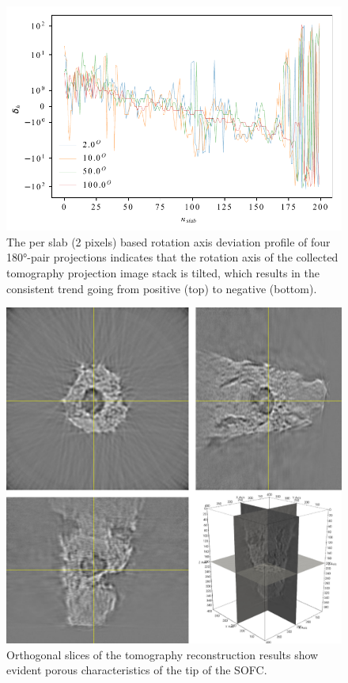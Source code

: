 \documentclass[12pt]{scrartcl}
\newcommand{\myscale}{1}
\begin{document}
\renewcommand{\myscale}{1.0}
\begin{figure}[htp]
\centering
\includegraphics[scale=\myscale]{rotationAxisTiltDemo_retouched}
\caption{
The per slab (2 pixels) based rotation axis deviation profile of four \ang{180}-pair projections indicates that the rotation axis of the collected tomography projection image stack is tilted, which results in the consistent trend going from positive (top) to negative (bottom).
}\label{fig: rotation axis tilt profile}
\end{figure}

\renewcommand{\myscale}{0.3}
\begin{figure}[htp]
\centering
\includegraphics[scale=\myscale]{recon_demo}
\caption{
Orthogonal slices of the tomography reconstruction results show evident porous characteristics of the tip of the SOFC. 
}\label{fig: recon demo}
\end{figure}
\end{document}
